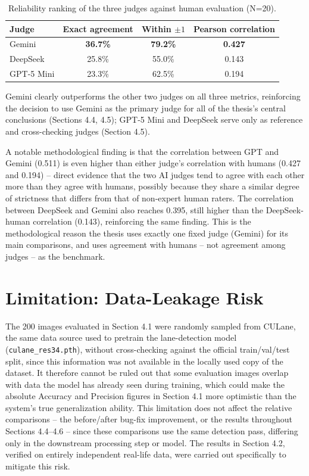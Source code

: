 \documentclass[12pt,a4paper]{report}
\begin{document}
\begin{table}[htbp]
    \centering
    \small
    \caption{Reliability ranking of the three judges against human evaluation (N=20).}
    \label{tab:4.8}
    \begin{tabular}{@{}lccc@{}}
        \toprule
        \textbf{Judge} & \textbf{Exact agreement} & \textbf{Within $\pm 1$} & \textbf{Pearson correlation} \\
        \midrule
        Gemini      & \textbf{36.7\%} & \textbf{79.2\%} & \textbf{0.427} \\
        DeepSeek    & 25.8\%          & 55.0\%          & 0.143 \\
        GPT-5 Mini  & 23.3\%          & 62.5\%          & 0.194 \\
        \bottomrule
    \end{tabular}
\end{table}

Gemini clearly outperforms the other two judges on all three metrics, reinforcing the decision to use Gemini as the primary judge for all of the thesis's central conclusions (Sections 4.4, 4.5); GPT-5 Mini and DeepSeek serve only as reference and cross-checking judges (Section 4.5).

A notable methodological finding is that the correlation between GPT and Gemini (0.511) is even higher than either judge's correlation with humans (0.427 and 0.194) -- direct evidence that the two AI judges tend to agree with each other more than they agree with humans, possibly because they share a similar degree of strictness that differs from that of non-expert human raters. The correlation between DeepSeek and Gemini also reaches 0.395, still higher than the DeepSeek-human correlation (0.143), reinforcing the same finding. This is the methodological reason the thesis uses exactly one fixed judge (Gemini) for its main comparisons, and uses agreement with humans -- not agreement among judges -- as the benchmark.

\section{Limitation: Data-Leakage Risk}

The 200 images evaluated in Section 4.1 were randomly sampled from CULane, the same data source used to pretrain the lane-detection model (\texttt{culane\_res34.pth}), without cross-checking against the official train/val/test split, since this information was not available in the locally used copy of the dataset. It therefore cannot be ruled out that some evaluation images overlap with data the model has already seen during training, which could make the absolute Accuracy and Precision figures in Section 4.1 more optimistic than the system's true generalization ability. This limitation does not affect the relative comparisons -- the before/after bug-fix improvement, or the results throughout Sections 4.4--4.6 -- since these comparisons use the same detection pass, differing only in the downstream processing step or model. The results in Section 4.2, verified on entirely independent real-life data, were carried out specifically to mitigate this risk.
\end{document}
